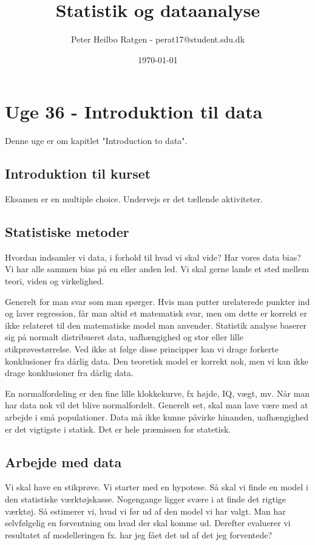 \documentclass{article}
\title{Statistik og dataanalyse}
\author{Peter Heilbo Ratgen - perat17@student.sdu.dk}
\date{\today}
\begin{document}
\maketitle
\newpage
\tableofcontents
\newpage
\section{Uge 36 - Introduktion til data}
Denne uge er om kapitlet "Introduction to data".
\subsection{Introduktion til kurset}
Eksamen er en multiple choice. Undervejs er det tællende aktiviteter.

\subsection{Statistiske metoder}
Hvordan indsamler vi data, i forhold til hvad vi skal vide? Har vores data bias?
Vi har alle sammen bias på en eller anden led. Vi skal gerne lande et sted
mellem teori, viden og virkelighed. 

Generelt for man svar som man spørger. Hvis man putter urelaterede punkter ind
og laver regression, får man altid et matematisk svar, men om dette er korrekt
er ikke relateret til den matematiske model man anvender. Statistik analyse
baserer sig på normalt distribueret data, uafhængighed og stor eller lille
stikprøvestørrelse. Ved ikke at følge disse principper kan vi drage forkerte
konklusioner fra dårlig data. Den teoretisk model er korrekt nok, men vi kan
ikke drage
konklusioner fra dårlig data.

En normalfordeling er den fine lille klokkekurve, fx højde, IQ, vægt, mv. Når
man har data nok vil det blive normalfordelt. Generelt set, skal man lave være
med at arbejde i små populationer.
Data må ikke kunne påvirke hinanden, uafhængighed er det vigtigste i statisk.
Det er hele præmissen for statetisk.

\subsection{Arbejde med data}
Vi skal have en stikprøve. Vi starter med en hypotese. Så skal vi finde en model
i den statistiske værktøjskasse. Nogengange ligger svære i at finde det rigtige
værktøj. Så estimerer vi, hvad vi før ud af den model vi har valgt. Man har
selvfølgelig en forventning om hvad der skal komme ud. Derefter evaluerer vi
resultatet af modelleringen fx. har jeg fået det ud af det jeg forventede?
\end{document}
